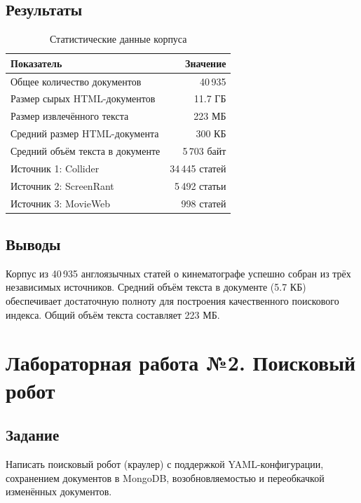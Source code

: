 \documentclass[a4paper,12pt]{article}
\begin{document}
\subsection{Результаты}

\begin{table}[H]
    \centering
    \caption{Статистические данные корпуса}
    \begin{tabular}{lr}
        \toprule
        \textbf{Показатель} & \textbf{Значение} \\
        \midrule
        Общее количество документов & 40\,935 \\
        Размер сырых HTML-документов & 11.7 ГБ \\
        Размер извлечённого текста & 223 МБ \\
        Средний размер HTML-документа & 300 КБ \\
        Средний объём текста в документе & 5\,703 байт \\
        Источник 1: Collider & 34\,445 статей \\
        Источник 2: ScreenRant & 5\,492 статьи \\
        Источник 3: MovieWeb & 998 статей \\
        \bottomrule
    \end{tabular}
\end{table}

\subsection{Выводы}

Корпус из 40\,935 англоязычных статей о кинематографе успешно собран из трёх независимых источников. Средний объём текста в документе (5.7 КБ) обеспечивает достаточную полноту для построения качественного поискового индекса. Общий объём текста составляет 223 МБ.


\newpage
\section{Лабораторная работа №2. Поисковый робот}

\subsection{Задание}

Написать поисковый робот (краулер) с поддержкой YAML-конфигурации, сохранением документов в MongoDB, возобновляемостью и переобкачкой изменённых документов.
\end{document}
